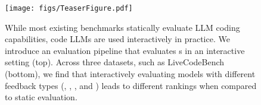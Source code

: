\begin{figure}[!t]
    \centering
    \texttt{[image: figs/TeaserFigure.pdf]}
    \caption{While most existing benchmarks statically evaluate LLM coding capabilities, code LLMs are used interactively in practice. We introduce an evaluation pipeline that evaluates \cm s in an interactive setting (top). Across three datasets, such as LiveCodeBench (bottom), we find that interactively evaluating models with different feedback types (\cf, \ir, \para, and \sent) leads to different rankings when compared to static evaluation.
    }
    \vspace{-5pt}
    \label{fig:teaser}
\end{figure}
